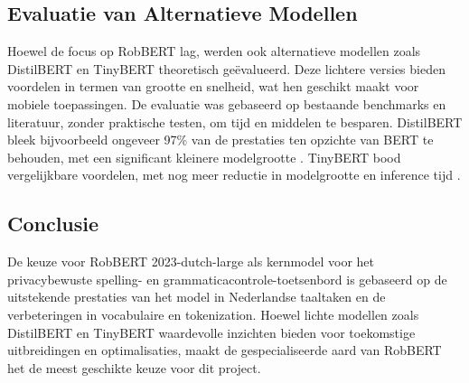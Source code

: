 \subsection{Evaluatie van Alternatieve Modellen}

Hoewel de focus op RobBERT lag, werden ook alternatieve modellen zoals DistilBERT en TinyBERT theoretisch geëvalueerd. Deze lichtere versies bieden voordelen in termen van grootte en snelheid, wat hen geschikt maakt voor mobiele toepassingen. De evaluatie was gebaseerd op bestaande benchmarks en literatuur, zonder praktische testen, om tijd en middelen te besparen. DistilBERT bleek bijvoorbeeld ongeveer 97\% van de prestaties ten opzichte van BERT te behouden, met een significant kleinere modelgrootte \autocite{Sanh2019DistilBERT}. TinyBERT bood vergelijkbare voordelen, met nog meer reductie in modelgrootte en inference tijd \autocite{Jiao2019TinyBERT}.

\subsection{Conclusie}

De keuze voor RobBERT 2023-dutch-large als kernmodel voor het privacybewuste spelling- en grammaticacontrole-toetsenbord is gebaseerd op de uitstekende prestaties van het model in Nederlandse taaltaken en de verbeteringen in vocabulaire en tokenization. Hoewel lichte modellen zoals DistilBERT en TinyBERT waardevolle inzichten bieden voor toekomstige uitbreidingen en optimalisaties, maakt de gespecialiseerde aard van RobBERT het de meest geschikte keuze voor dit project.
